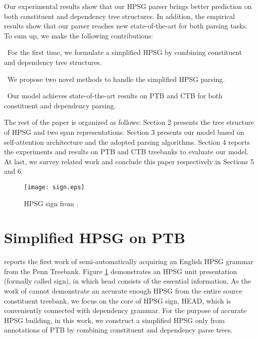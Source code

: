 \documentclass[11pt,a4paper]{article}
\begin{document}
Our experimental results show that our HPSG parser brings better prediction on both constituent and dependency tree structures.
In addition, the empirical results show that our parser reaches new state-of-the-art for both parsing tasks.
To sum up, we make the following contributions:

\textbullet \ For the first time, we formulate a simplified HPSG by combining constituent and dependency tree structures.

\textbullet \ We propose two novel methods to handle the simplified HPSG parsing.

\textbullet \ Our model achieves state-of-the-art results on PTB and CTB for both constituent and dependency parsing.

The rest of the paper is organized as follows: Section 2 presents the tree structure of HPSG and two span representations. Section 3 presents our model based on self-attention architecture and the adopted parsing algorithms. 
Section 4 reports the experiments and results on PTB and CTB treebanks to evaluate our model. 
At last, we survey related work and conclude this paper respectively in Sections 5 and 6.

\begin{figure}[t!]
    \centering
    \texttt{[image: sign.eps]}
    
    \caption{HPSG sign from \cite{Miyao2004CorpusOrientedGD}.}
    \label{sign}
\end{figure}

\section{Simplified HPSG on PTB}

\cite{Miyao2004CorpusOrientedGD} reports the first work of semi-automatically acquiring an English HPSG grammar from the Penn Treebank. Figure \ref{sign} demonstrates an HPSG unit presentation (formally called sign), in which head consists of the essential information.    
As the work of \cite{Miyao2004CorpusOrientedGD} cannot demonstrate an accurate enough HPSG from the entire source constituent treebank, we focus on the core of HPSG sign, HEAD, which is conveniently connected with dependency grammar. For the purpose of accurate HPSG building, in this work, we construct a simplified HPSG only from annotations of PTB by combining constituent and dependency parse trees.
\end{document}
